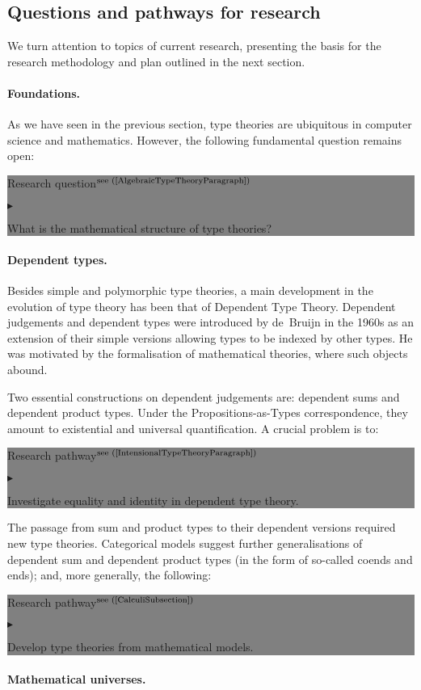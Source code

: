 \documentclass[11pt,twocolumn]{article}
\newenvironment{btritemize}
  {\begin{list}{\btr}
  {\setlength{\topsep}{2pt}
   \setlength{\partopsep}{2pt}
   \setlength{\itemsep}{2.5pt}
   \setlength{\parsep}{2.5pt}
   \setlength{\leftmargin}{1em}
   \setlength{\labelwidth}{.5em}}}
  {\end{list}}
\newcommand{\mytextsf}[1]{\textsf{\small #1}}
\newcommand{\btr}{$\blacktriangleright$}
\newcommand{\reqpsize}{8.113395cm}%
\newcommand{\req}[2]{\begin{center}\colorbox{grey}{\begin{minipage}{\reqpsize} 
  \mytextsf{Research question}\hfill$^{\mbox{\scriptsize see (#1) }}$\\[-5.5mm]
  \begin{btritemize}
  \item #2
  \end{btritemize}
\end{minipage}}\end{center}}
\newcommand{\rep}[2]{\begin{center}\colorbox{grey}{\begin{minipage}{\reqpsize}
  \mytextsf{Research pathway}\hfill$^{\mbox{\scriptsize see (#1) }}$\\[-5.5mm]
  \begin{btritemize}
  \item #2
  \end{btritemize}
\end{minipage}}\end{center}}
\begin{document}
\subsection{Questions and pathways for research}

We turn attention to topics of current research, presenting the basis for
the research methodology and plan outlined in the next section.

\paragraph*{Foundations.}

As we have seen in the previous section, type theories are ubiquitous in
computer science and mathematics.  However, the following fundamental question
remains open:
\req{\ref{AlgebraicTypeTheoryParagraph}}
{What is the mathematical structure of type theories?}

\paragraph*{Dependent types.}

Besides simple and polymorphic type theories, a main development in the
evolution of type theory has been that of Dependent Type Theory.  Dependent
judgements and dependent types were introduced by de~Bruijn %
in the 1960s as an extension of their simple versions allowing types to be
indexed by other types.  He was motivated by the formalisation of
mathematical theories, where such objects abound.  

Two essential constructions on dependent judgements are: dependent sums and
dependent product types.  Under the Propositions-as-Types correspondence, they
amount to existential and universal quantification.  A crucial problem is to:
\rep{\ref{IntensionalTypeTheoryParagraph}}
  {Investigate equality and identity in dependent type theory.}

The passage from sum and product types to their dependent versions
required new type theories.  
%
Categorical models suggest further generalisations of dependent sum and
dependent product types (in the form of so-called coends and ends); and,
more generally, the following:
\rep{\ref{CalculiSubsection}}
  {Develop type theories from mathematical models.}

\paragraph*{Mathematical universes.}
\end{document}

